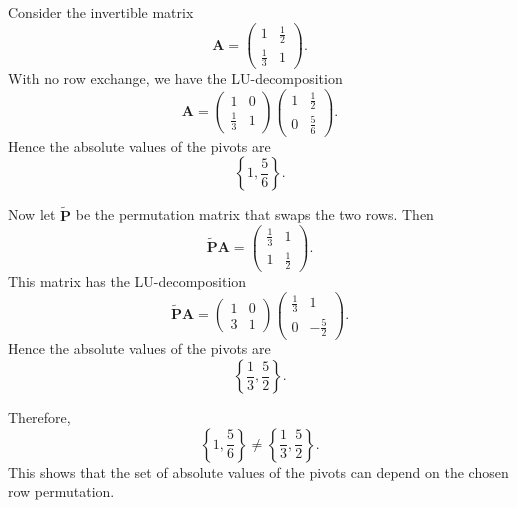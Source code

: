     \begin{solution}
        Consider the invertible matrix
        \[
            \mathbf{A}
            =
            \begin{pmatrix}
                1 & \frac{1}{2} \\
                \frac{1}{3} & 1
            \end{pmatrix}.
        \]
        With no row exchange, we have the LU-decomposition
        \[
            \mathbf{A}
            =
            \begin{pmatrix}
                1 & 0 \\
                \frac{1}{3} & 1
            \end{pmatrix}
            \begin{pmatrix}
                1 & \frac{1}{2} \\
                0 & \frac{5}{6}
            \end{pmatrix}.
        \]
        Hence the absolute values of the pivots are
        \[
            \left\{1,\frac{5}{6}\right\}.
        \]

        Now let $\widetilde{\mathbf{P}}$ be the permutation matrix that swaps the two rows. Then
        \[
            \widetilde{\mathbf{P}}\mathbf{A}
            =
            \begin{pmatrix}
                \frac{1}{3} & 1 \\
                1 & \frac{1}{2}
            \end{pmatrix}.
        \]
        This matrix has the LU-decomposition
        \[
            \widetilde{\mathbf{P}}\mathbf{A}
            =
            \begin{pmatrix}
                1 & 0 \\
                3 & 1
            \end{pmatrix}
            \begin{pmatrix}
                \frac{1}{3} & 1 \\
                0 & -\frac{5}{2}
            \end{pmatrix}.
        \]
        Hence the absolute values of the pivots are
        \[
            \left\{\frac{1}{3},\frac{5}{2}\right\}.
        \]

        Therefore,
        \[
            \left\{1,\frac{5}{6}\right\}
            \neq
            \left\{\frac{1}{3},\frac{5}{2}\right\}.
        \]
        This shows that the set of absolute values of the pivots can depend on the chosen row
        permutation.
    \end{solution}

